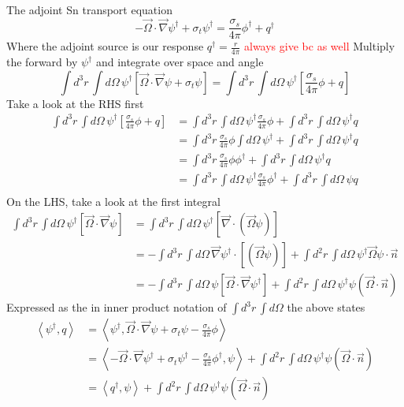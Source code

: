 \documentclass{article}
\newcommand{\vO}{\vec{\Omega}}
\newcommand{\bra}{\left\langle}
\newcommand{\ket}{\right\rangle}
\newcommand{\vdiv}{\vec{\nabla} \cdot}
\newcommand{\vgrad}{\vec{\nabla}}
\begin{document}
The adjoint Sn transport equation
\[
- \vO \cdot \vgrad \psi^\dag + \sigma_t \psi^\dag = \frac{\sigma_s}{4 \pi} \phi^\dag + q^\dag
\]
Where the adjoint source is our response $q^\dag = \frac{r}{4 \pi}$
\textcolor{red}{always give bc as well}
Multiply the forward by $\psi^\dag$ and integrate over space and angle
\[
\int d^3 r \, \int d  \Omega \,  \psi^\dag \left[ \vO \cdot \vgrad \psi + \sigma_t \psi  \right] = 
\int d^3 r \, \int d  \Omega \,  \psi^\dag \left[ \frac{\sigma_s}{4 \pi} \phi + q \right]
\]
Take a look at the RHS first
\begin{align*}
\int d^3 r \, \int d  \Omega \,  \psi^\dag \left[ \frac{\sigma_s}{4 \pi} \phi + q \right]
&= 
\int d^3 r \, \int d  \Omega \,  \psi^\dag \frac{\sigma_s}{4 \pi} \phi + \int d^3 r \, \int d  \Omega \,  \psi^\dag q \\
&= 
\int d^3 r \, \frac{\sigma_s}{4 \pi} \phi \int d  \Omega \,  \psi^\dag  + \int d^3 r \, \int d  \Omega \,  \psi^\dag q \\
&= 
\int d^3 r \, \frac{\sigma_s}{4 \pi} \phi  \phi^\dag  + \int d^3 r \, \int d  \Omega \,  \psi^\dag q \\
&= 
\int d^3 r \, \int d  \Omega \,  \psi^\dag \frac{\sigma_s}{4 \pi} \phi^\dag + \int d^3 r \, \int d  \Omega \,  \psi q \\
\end{align*}
On the LHS, take a look at the first integral
\begin{align*}
\int d^3 r \, \int d  \Omega \,  \psi^\dag \left[  \vO \cdot \vgrad \psi \right]
&= \int d^3 r \, \int d  \Omega \,  \psi^\dag \left[  \vdiv (\vO \psi) \right] \\
&= - \int d^3 r \, \int d  \Omega \,  \vgrad \psi^\dag \cdot \left[(\vO \psi) \right] 
+ \int d^2 r \, \int d  \Omega \, \psi^\dag \vO \psi \cdot \vec{n} \\
&= - \int d^3 r \, \int d  \Omega \,  \psi \left[  \vO \cdot \vgrad \psi^\dag \right] 
+ \int d^2 r \, \int d  \Omega \, \psi^\dag \psi ( \vO \cdot \vec{n})
\end{align*}
Expressed as the in inner product notation of $\int d^3 r \, \int d  \Omega $ the above states
\begin{align*}
\bra \psi^\dag , q \ket &=  \bra \psi^\dag , \vO \cdot \vgrad \psi + \sigma_t \psi - \frac{\sigma_s}{4 \pi} \phi \ket \\
&=  \bra - \vO \cdot \vgrad \psi^\dag + \sigma_t \psi^\dag - \frac{\sigma_s}{4 \pi} \phi^\dag , \psi \ket + \int d^2 r \, \int d  \Omega \, \psi^\dag \psi ( \vO \cdot \vec{n} ) \\
&=  \bra q^\dag , \psi \ket + \int d^2 r \, \int d  \Omega \, \psi^\dag \psi ( \vO \cdot \vec{n} ) \\
\end{align*}
\end{document}
